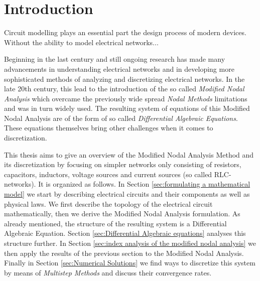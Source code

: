 \chapter{Introduction}

	Circuit modelling plays an essential part the design process of modern devices. Without the ability to model electrical networks...
	
	Beginning in the last century and still ongoing research has made many advancements in understanding electrical networks and in developing more sophisticated methods of analyzing and discretizing electrical networks. In the late 20th century, this lead to the introduction of the so called \emph{Modified Nodal Analysis} which overcame the previously wide spread \emph{Nodal Methods} limitations and was in turn widely used. The resulting system of equations of this Modified Nodal Analysis are of the form of so called \emph{Differential Algebraic Equations}. These equations themselves bring other challenges when it comes to discretization. 
	
	This thesis aims to give an overview of the Modified Nodal Analysis Method and its discretization by focusing on simpler networks only consisting of resistors, capacitors, inductors, voltage sources and current sources (so called RLC-networks). It is organized as follows. In Section \ref{sec:formulating a mathematical model} we start by describing electrical circuits and their components as well as physical laws. We first describe the topology of the electrical circuit mathematically, then we derive the Modified Nodal Analysis formulation. As already mentioned, the structure of the resulting system is a Differential Algebraic Equation. Section \ref{sec:Differential Algebraic equations} analyses this structure further. In Section \ref{sec:index analysis of the modified nodal analysis} we then apply the results of the previous section to the Modified Nodal Analysis. Finally in Section \ref{sec:Numerical Solutions} we find ways to discretize this system by means of \emph{Multistep Methods} and discuss their convergence rates.
